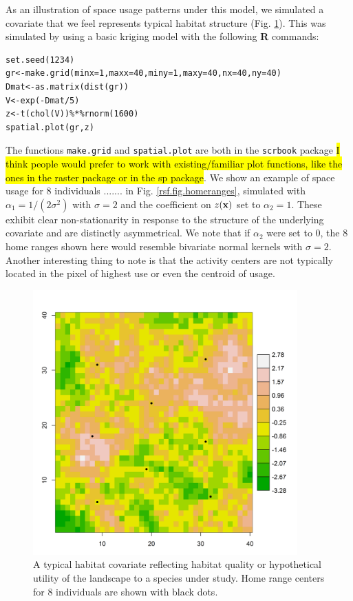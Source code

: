 As an illustration of space usage patterns under this model, we
simulated a covariate that we feel represents typical habitat
structure (Fig. \ref{rsf.fig.habitat}). This was simulated by using a
basic kriging model with the following {\bf R} commands:
\begin{verbatim}
set.seed(1234)
gr<-make.grid(minx=1,maxx=40,miny=1,maxy=40,nx=40,ny=40)
Dmat<-as.matrix(dist(gr))
V<-exp(-Dmat/5)
z<-t(chol(V))%*%rnorm(1600)
spatial.plot(gr,z)
\end{verbatim}
The functions \mbox{\tt make.grid} and \mbox{\tt spatial.plot} are
both in the \mbox{\tt scrbook} package \hl{I think people would prefer
  to work with existing/familiar plot functions, like the ones in the raster
  package or in the sp package}.  We show an example of space
usage for 8 individuals ....... in Fig. \ref{rsf.fig.homeranges},
simulated with $\alpha_{1} = 1/(2\sigma^2)$ with $\sigma = 2$ and the
coefficient on $z({\bf x})$ set to $\alpha_{2} = 1$.  These exhibit clear
non-stationarity in response to the structure of the underlying
covariate and are distinctly asymmetrical.  We note that if
$\alpha_{2}$ were set to 0, the 8 home ranges shown here would
resemble bivariate normal kernels with $\sigma = 2$.  Another
interesting thing to note is that the activity centers are not
typically located in the pixel of highest use or even the centroid of
usage.

\begin{figure}[htp]
\centering
\includegraphics[width=4in,height=4in]{Ch10b/figs/habitat}
\caption{A typical habitat covariate reflecting habitat quality or
  hypothetical utility of the landscape to a species under study. Home range centers for 8 individuals are
shown with black dots.}
\label{rsf.fig.habitat}
\end{figure}


